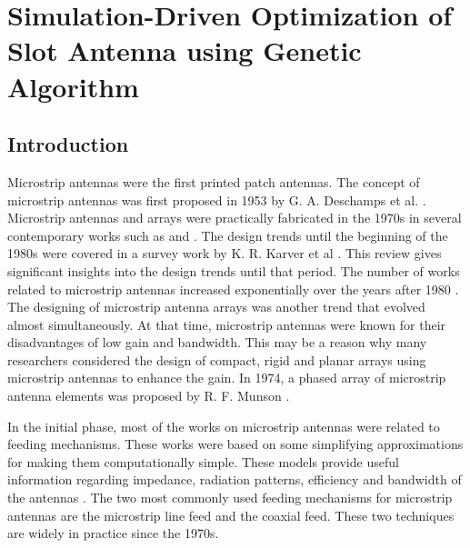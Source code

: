 \chapter{Simulation-Driven Optimization of Slot Antenna using Genetic Algorithm}
\label{chap:chap3}
\section{Introduction}\label{c3sec_intro}
Microstrip antennas were the first printed patch antennas. The concept of microstrip antennas was first proposed in 1953 by G. A. Deschamps et al. \cite{mpa00}. Microstrip antennas and arrays were practically fabricated in the 1970s in several contemporary works such as \cite{mpa02} and \cite{txmPhasedArray}. The design trends until the beginning of the 1980s were covered in a survey work by K. R. Karver et al \cite{mpaSurvTech}. This review gives significant insights into the design trends until that period. The number of works related to microstrip antennas increased exponentially over the years after 1980 \cite{mpaHist01}. The designing of microstrip antenna arrays was another trend that evolved almost simultaneously. At that time, microstrip antennas were known for their disadvantages of low gain and bandwidth. This may be a reason why many researchers considered the design of compact, rigid and planar arrays using microstrip antennas to enhance the gain. In 1974, a phased array of microstrip antenna elements was proposed by R. F. Munson \cite{txmPhasedArray}.

In the initial phase, most of the works on microstrip antennas were related to feeding mechanisms. These works were based on some simplifying approximations for making them computationally simple. These models provide useful information regarding impedance, radiation patterns, efficiency and bandwidth of the antennas \cite{mpaReview1992}. The two most commonly used feeding mechanisms for microstrip antennas are the microstrip line feed and the coaxial feed. These two techniques are widely in practice since the 1970s.


